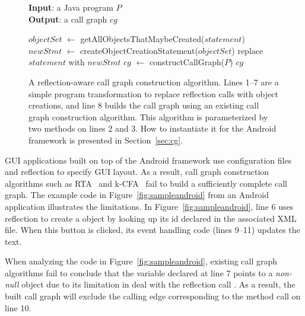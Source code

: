 \begin{figure}[t]
\textbf{Input}: a Java program $\mathit{P}$\\
\textbf{Output}: a call graph $\mathit{cg}$\\
\vspace{-5mm}
\begin{algorithmic}[1]
\STATE $\mathit{objectSet}$ $\leftarrow$ getAllObjectsThatMaybeCreated($\mathit{statement}$)
\STATE $\mathit{newStmt}$ $\leftarrow$ createObjectCreationStatement($\mathit{objectSet}$)
\STATE replace $\mathit{statement}$ with $\mathit{newStmt}$
\ENDIF
\ENDFOR
\STATE $\mathit{cg}$ $\leftarrow$ constructCallGraph($\mathit{P}$)
\RETURN $\mathit{cg}$
\end{algorithmic}
\vspace{-3mm}
\caption{A reflection-aware call graph construction algorithm. Lines
1--7 are a simple program transformation to replace reflection calls
with object creations, and line 8 builds the call graph using
an existing call graph construction algorithm. This algorithm
is parameterized by two methods on lines 2 and 3. 
How to instantiate it for the Android framework is presented in Section~\ref{sec:cg}.
} 
\label{fig:cgalgorithm}
\end{figure}

GUI applications built on top of the Android framework
use configuration files and reflection to specify GUI layout.
As a result, call graph construction algorithms such as RTA~\cite{rta}
and k-CFA~\cite{kcfa} fail to build a sufficiently complete call graph.
The example code in Figure~\ref{fig:sampleandroid} from an Android application
 illustrates the limitations.
In Figure~\ref{fig:sampleandroid}, line 6 uses reflection to create a 
object by looking up its id declared in the associated XML file. When this button
is clicked, its event handling code (lines 9--11) updates the text.

When analyzing the code in Figure~\ref{fig:sampleandroid}, existing call graph algorithms
fail to conclude that the variable  declared at line 7
points to a \textit{non-null}  object due to its limitation in deal with the
reflection call . As a result, the built 
call graph will exclude the calling edge corresponding to the
 method call on line 10. 

